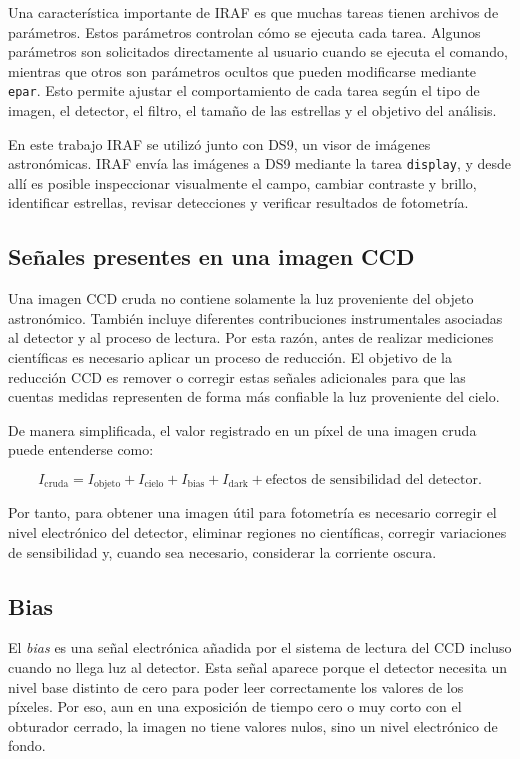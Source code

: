 \documentclass[12pt,letterpaper]{article}
\begin{document}
Una característica importante de IRAF es que muchas tareas tienen archivos de parámetros. Estos parámetros controlan cómo se ejecuta cada tarea. Algunos parámetros son solicitados directamente al usuario cuando se ejecuta el comando, mientras que otros son parámetros ocultos que pueden modificarse mediante \texttt{epar}. Esto permite ajustar el comportamiento de cada tarea según el tipo de imagen, el detector, el filtro, el tamaño de las estrellas y el objetivo del análisis.

En este trabajo IRAF se utilizó junto con DS9, un visor de imágenes astronómicas. IRAF envía las imágenes a DS9 mediante la tarea \texttt{display}, y desde allí es posible inspeccionar visualmente el campo, cambiar contraste y brillo, identificar estrellas, revisar detecciones y verificar resultados de fotometría.

\subsection{Señales presentes en una imagen CCD}

Una imagen CCD cruda no contiene solamente la luz proveniente del objeto astronómico. También incluye diferentes contribuciones instrumentales asociadas al detector y al proceso de lectura. Por esta razón, antes de realizar mediciones científicas es necesario aplicar un proceso de reducción. El objetivo de la reducción CCD es remover o corregir estas señales adicionales para que las cuentas medidas representen de forma más confiable la luz proveniente del cielo.

De manera simplificada, el valor registrado en un píxel de una imagen cruda puede entenderse como:

\begin{equation}
    I_{\text{cruda}} = I_{\text{objeto}} + I_{\text{cielo}} + I_{\text{bias}} + I_{\text{dark}} + \text{efectos de sensibilidad del detector}.
\end{equation}

Por tanto, para obtener una imagen útil para fotometría es necesario corregir el nivel electrónico del detector, eliminar regiones no científicas, corregir variaciones de sensibilidad y, cuando sea necesario, considerar la corriente oscura.

\subsection{Bias}

El \textit{bias} es una señal electrónica añadida por el sistema de lectura del CCD incluso cuando no llega luz al detector. Esta señal aparece porque el detector necesita un nivel base distinto de cero para poder leer correctamente los valores de los píxeles. Por eso, aun en una exposición de tiempo cero o muy corto con el obturador cerrado, la imagen no tiene valores nulos, sino un nivel electrónico de fondo.
\end{document}
